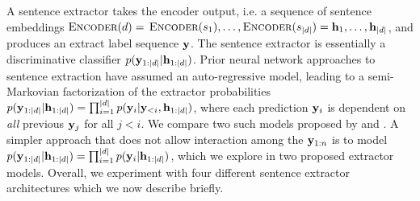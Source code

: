A sentence extractor takes the encoder output, i.e. 
a sequence of sentence embeddings
$\textsc{Encoder}(d) =$ $\textsc{Encoder}(s_1), \ldots, \textsc{Encoder}(s_{|d|}) =
\mathbf{h}_1, \ldots, \mathbf{h}_{|d|}$, and produces an extract label sequence
$\mathbf{y}$. 
The sentence extractor is essentially a discriminative
classifier $p(\mathbf{y}_{1:| d |} | \mathbf{h}_{1:| d |})$.
Prior neural network approaches 
\citep{nallapati2016summarunner,cheng2016neural} 
to sentence extraction have assumed
an auto-regressive model, leading to a semi-Markovian
factorization of the extractor probabilities
$p(\mathbf{y}_{1:| d |} | \mathbf{h}_{1:| d |})=\prod_{i=1}^{|d|} 
p(\mathbf{y}_i|\mathbf{y}_{<i},\mathbf{h}_{1:| d |})$,
where each prediction $\mathbf{y}_i$ is dependent on \emph{all}
previous $\mathbf{y}_j$ for
all $j < i$. We compare two such models proposed by \cite{cheng2016neural}
and \cite{nallapati2016summarunner}.
A simpler approach that does not allow interaction among the $\mathbf{y}_{1:n}$
is to
model $p(\mathbf{y}_{1:| d |}|\mathbf{h}_{1:| d |}) = 
\prod_{i=1}^{| d |} p(\mathbf{y}_i|\mathbf{h}_{1:| d |})$,
which we explore in two proposed extractor models.
Overall, we experiment with four different sentence extractor architectures
which we now describe briefly.

